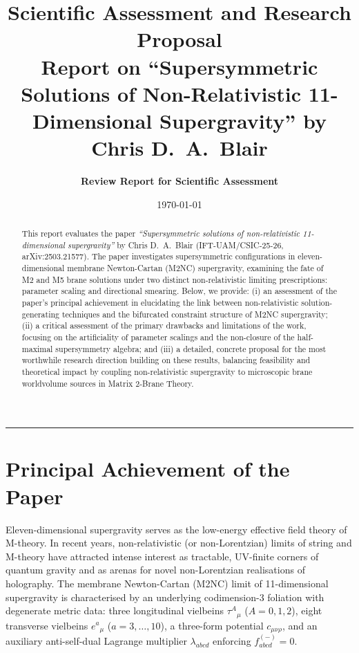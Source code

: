 \documentclass[11pt,a4paper]{article}
\title{\textbf{Scientific Assessment and Research Proposal}\\[0.5ex]
\large Report on ``Supersymmetric Solutions of Non-Relativistic 11-Dimensional Supergravity'' by Chris D.~A.~Blair}
\author{\textbf{Review Report for Scientific Assessment}}
\date{\today}
\begin{document}
\maketitle

\begin{abstract}
This report evaluates the paper \emph{``Supersymmetric solutions of non-relativistic 11-dimensional supergravity''} by Chris D.~A.~Blair (IFT-UAM/CSIC-25-26, arXiv:2503.21577). The paper investigates supersymmetric configurations in eleven-dimensional membrane Newton-Cartan (M2NC) supergravity, examining the fate of M2 and M5 brane solutions under two distinct non-relativistic limiting prescriptions: parameter scaling and directional smearing. Below, we provide: (i) an assessment of the paper's principal achievement in elucidating the link between non-relativistic solution-generating techniques and the bifurcated constraint structure of M2NC supergravity; (ii) a critical assessment of the primary drawbacks and limitations of the work, focusing on the artificiality of parameter scalings and the non-closure of the half-maximal supersymmetry algebra; and (iii) a detailed, concrete proposal for the most worthwhile research direction building on these results, balancing feasibility and theoretical impact by coupling non-relativistic supergravity to microscopic brane worldvolume sources in Matrix 2-Brane Theory.
\end{abstract}

\vspace{0.5em}
\hrule
\vspace{0.5em}

\section{Principal Achievement of the Paper}

Eleven-dimensional supergravity serves as the low-energy effective field theory of M-theory. In recent years, non-relativistic (or non-Lorentzian) limits of string and M-theory have attracted intense interest as tractable, UV-finite corners of quantum gravity and as arenas for novel non-Lorentzian realisations of holography. The membrane Newton-Cartan (M2NC) limit of 11-dimensional supergravity is characterised by an underlying codimension-3 foliation with degenerate metric data: three longitudinal vielbeins $\tau^A{}_\mu$ ($A=0,1,2$), eight transverse vielbeins $e^a{}_\mu$ ($a=3,\dots,10$), a three-form potential $c_{\mu\nu\rho}$, and an auxiliary anti-self-dual Lagrange multiplier $\lambda_{abcd}$ enforcing $f^{(-)}_{abcd}=0$.
\end{document}
